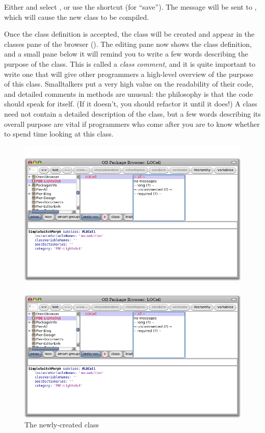 \documentclass[a4paper,10pt,twoside]{book}
\begin{document}
Either \actclick and select , or use the shortcut  (for ``save'').
The message will be sent to , which will cause the new class to be compiled.

Once the class definition is accepted, the class will be created and appear in the classes pane of the browser ().
The editing pane now shows the class definition, and a small pane below it will remind you to write a few words describing the purpose of the class. This is called a \emph{class comment}, and it is quite important to write one that will give other programmers a high-level overview of the purpose of this class.
Smalltalkers put a very high value on the readability of their code, and detailed comments in methods are unusual: the philosophy is that the code should speak for itself. (If it doesn't, you should refactor it until it does!) A class  need not contain a detailed description of the class, but a few words describing its overall purpose are vital if programmers who come after you are to know whether to spend time looking at this class.


\begin{figure}[h!t]
\ifluluelse
	{\centerline {\includegraphics[width=\textwidth]{LOCell}}}
	{\centerline {\includegraphics[scale=0.7]{LOCell}}}
\caption{The newly-created class \label{fig:LOCell}}
\end{figure}
\end{document}
